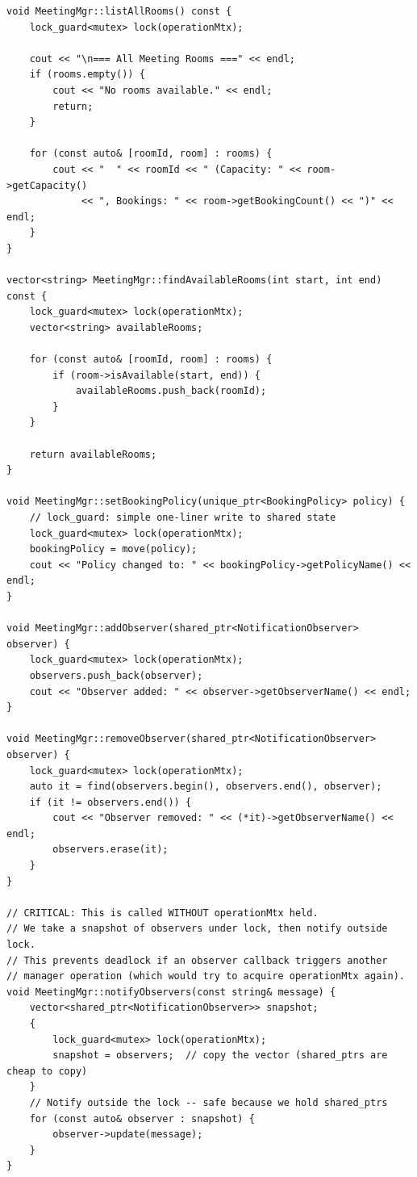 \documentclass[11pt,a4paper]{article}
\begin{document}
\begin{lstlisting}[title={\texttt{managers.cpp}}]
void MeetingMgr::listAllRooms() const {
    lock_guard<mutex> lock(operationMtx);
    
    cout << "\n=== All Meeting Rooms ===" << endl;
    if (rooms.empty()) {
        cout << "No rooms available." << endl;
        return;
    }
    
    for (const auto& [roomId, room] : rooms) {
        cout << "  " << roomId << " (Capacity: " << room->getCapacity() 
             << ", Bookings: " << room->getBookingCount() << ")" << endl;
    }
}

vector<string> MeetingMgr::findAvailableRooms(int start, int end) const {
    lock_guard<mutex> lock(operationMtx);
    vector<string> availableRooms;
    
    for (const auto& [roomId, room] : rooms) {
        if (room->isAvailable(start, end)) {
            availableRooms.push_back(roomId);
        }
    }
    
    return availableRooms;
}

void MeetingMgr::setBookingPolicy(unique_ptr<BookingPolicy> policy) {
    // lock_guard: simple one-liner write to shared state
    lock_guard<mutex> lock(operationMtx);
    bookingPolicy = move(policy);
    cout << "Policy changed to: " << bookingPolicy->getPolicyName() << endl;
}

void MeetingMgr::addObserver(shared_ptr<NotificationObserver> observer) {
    lock_guard<mutex> lock(operationMtx);
    observers.push_back(observer);
    cout << "Observer added: " << observer->getObserverName() << endl;
}

void MeetingMgr::removeObserver(shared_ptr<NotificationObserver> observer) {
    lock_guard<mutex> lock(operationMtx);
    auto it = find(observers.begin(), observers.end(), observer);
    if (it != observers.end()) {
        cout << "Observer removed: " << (*it)->getObserverName() << endl;
        observers.erase(it);
    }
}

// CRITICAL: This is called WITHOUT operationMtx held.
// We take a snapshot of observers under lock, then notify outside lock.
// This prevents deadlock if an observer callback triggers another
// manager operation (which would try to acquire operationMtx again).
void MeetingMgr::notifyObservers(const string& message) {
    vector<shared_ptr<NotificationObserver>> snapshot;
    {
        lock_guard<mutex> lock(operationMtx);
        snapshot = observers;  // copy the vector (shared_ptrs are cheap to copy)
    }
    // Notify outside the lock -- safe because we hold shared_ptrs
    for (const auto& observer : snapshot) {
        observer->update(message);
    }
}
\end{lstlisting}
\end{document}

